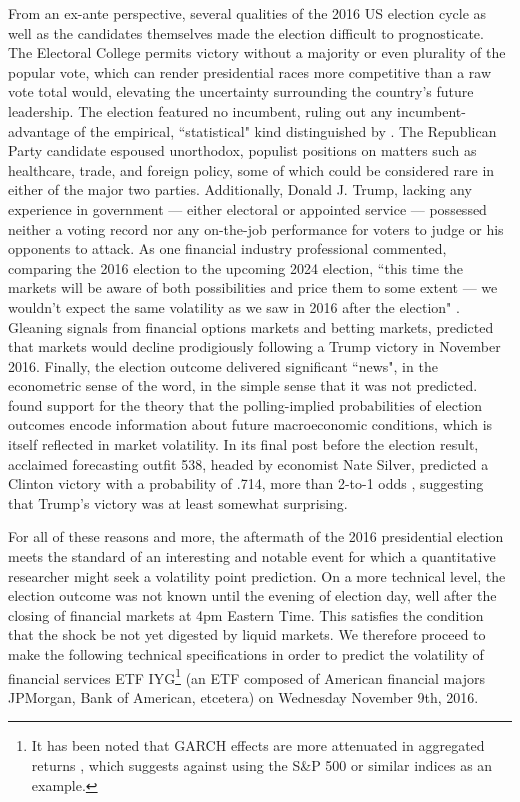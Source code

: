 \documentclass[11pt,3p,review,authoryear]{elsarticle}
\theoremstyle{definition}
\begin{document}
From an ex-ante perspective, several qualities of the 2016 US election cycle as well as the candidates themselves made the election difficult to prognosticate.  The Electoral College permits victory without a majority or even plurality of the popular vote, which can render presidential races more competitive than a raw vote total would, elevating the uncertainty surrounding the country's future leadership.  The election featured no incumbent, ruling out any incumbent-advantage of the empirical, ``statistical" kind distinguished by \citet{mayhew2008incumbency}.  The Republican Party candidate espoused unorthodox, populist positions on matters such as healthcare, trade, and foreign policy, some of which could be considered rare in either of the major two parties.  Additionally, Donald J. Trump, lacking any experience in government --- either electoral or appointed service --- possessed neither a voting record nor any on-the-job performance for voters to judge or his opponents to attack. As one financial industry professional commented, comparing the 2016 election to the upcoming 2024 election, ``this time the markets will be aware of both possibilities and price them to some extent — we wouldn’t expect the same volatility as we saw in 2016 after the election" \citep{News_2024}. Gleaning signals from financial options markets and betting markets, \citet{wolfers2016financial} predicted that markets would decline prodigiously following a Trump victory in November 2016.  Finally, the election outcome delivered significant ``news", in the econometric sense of the word, in the simple sense that it was not predicted.  \citet{goodell2013us} found support for the theory that the polling-implied probabilities of election outcomes encode information about future macroeconomic conditions, which is itself reflected in market volatility.  In its final post before the election result, acclaimed forecasting outfit 538, headed by economist Nate Silver, predicted a Clinton victory with a probability of .714, more than 2-to-1 odds \citep{Silver_2016}, suggesting that Trump's victory was at least somewhat surprising.  

For all of these reasons and more, the aftermath of the 2016 presidential election meets the standard of an interesting and notable event for which a quantitative researcher might seek a volatility point prediction.  On a more technical level, the election outcome was not known until the evening of election day, well after the closing of financial markets at 4pm Eastern Time.  This satisfies the condition that the shock be not yet digested by liquid markets.  We therefore proceed to make the following technical specifications in order to predict the volatility of financial services ETF IYG\footnote{It has been noted that GARCH effects are more attenuated in aggregated returns \citep{zivot2009practical}, which suggests against using the S\&P 500 or similar indices as an example.} (an ETF composed of American financial majors JPMorgan, Bank of American, etcetera) on Wednesday November 9th, 2016.
\end{document}
